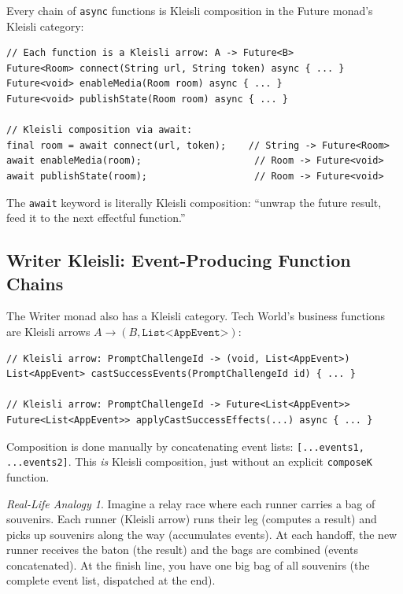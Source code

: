 \documentclass[12pt,a4paper]{article}
\theoremstyle{definition}
\theoremstyle{plain}
\theoremstyle{remark}
\newtheorem*{reallife}{Real-Life Analogy}
\begin{document}
\begin{youknow}
Every chain of \texttt{async} functions is Kleisli composition in the
Future monad's Kleisli category:
\begin{lstlisting}
// Each function is a Kleisli arrow: A -> Future<B>
Future<Room> connect(String url, String token) async { ... }
Future<void> enableMedia(Room room) async { ... }
Future<void> publishState(Room room) async { ... }

// Kleisli composition via await:
final room = await connect(url, token);    // String -> Future<Room>
await enableMedia(room);                    // Room -> Future<void>
await publishState(room);                   // Room -> Future<void>
\end{lstlisting}
The \texttt{await} keyword is literally Kleisli composition:
``unwrap the future result, feed it to the next effectful function.''
\end{youknow}

\subsection{Writer Kleisli: Event-Producing Function Chains}

The Writer monad also has a Kleisli category. Tech World's business functions
are Kleisli arrows $A \to (B, \texttt{List<AppEvent>})$:

\begin{lstlisting}
// Kleisli arrow: PromptChallengeId -> (void, List<AppEvent>)
List<AppEvent> castSuccessEvents(PromptChallengeId id) { ... }

// Kleisli arrow: PromptChallengeId -> Future<List<AppEvent>>
Future<List<AppEvent>> applyCastSuccessEffects(...) async { ... }
\end{lstlisting}

Composition is done manually by concatenating event lists:
\texttt{[...events1, ...events2]}. This \emph{is} Kleisli composition,
just without an explicit \texttt{composeK} function.

\begin{reallife}
Imagine a relay race where each runner carries a bag of souvenirs.
Each runner (Kleisli arrow) runs their leg (computes a result) and
picks up souvenirs along the way (accumulates events).
At each handoff, the new runner receives the baton (the result)
and the bags are combined (events concatenated).
At the finish line, you have one big bag of all souvenirs
(the complete event list, dispatched at the end).
\end{reallife}
\end{document}
